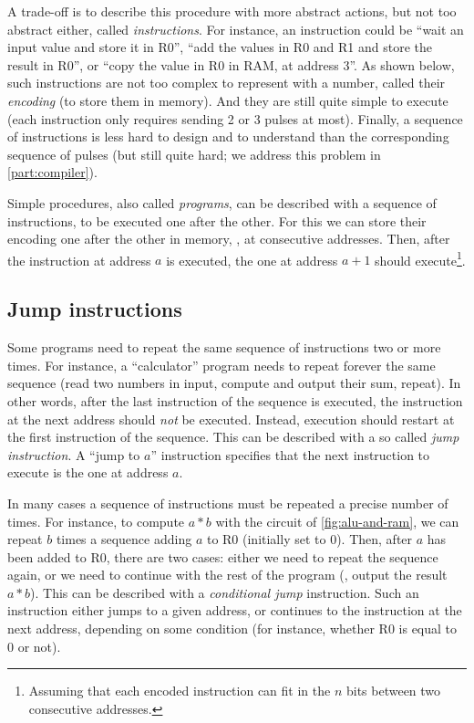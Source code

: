 A trade-off is to describe this procedure with more abstract actions, but not
too abstract either, called {\em instructions}. For instance, an instruction
could be ``wait an input value and store it in R0'', ``add the values in R0 and
R1 and store the result in R0'', or ``copy the value in R0 in RAM, at address
3''. As shown below, such instructions are not too complex to represent with a
number, called their {\em encoding} (to store them in memory). And they are
still quite simple to execute (each instruction only requires sending 2 or 3
pulses at most). Finally, a sequence of instructions is less hard to design and
to understand than the corresponding sequence of pulses (but still quite hard;
we address this problem in \cref{part:compiler}).

Simple procedures, also called {\em programs}, can be described with a sequence
of instructions, to be executed one after the other. For this we can store
their encoding one after the other in memory, \ie, at consecutive addresses.
Then, after the instruction at address $a$ is executed, the one at address
$a+1$ should execute\footnote{Assuming that each encoded instruction can fit in
the $n$ bits between two consecutive addresses.}.

\subsection{Jump instructions}

Some programs need to repeat the same sequence of instructions two or more
times. For instance, a ``calculator'' program needs to repeat forever the same
sequence (read two numbers in input, compute and output their sum, repeat). In
other words, after the last instruction of the sequence is executed, the
instruction at the next address should {\em not} be executed. Instead,
execution should restart at the first instruction of the sequence. This can be
described with a so called {\em jump instruction}. A ``jump to $a$''
instruction specifies that the next instruction to execute is the one at
address $a$.

In many cases a sequence of instructions must be repeated a precise number of
times. For instance, to compute $a*b$ with the circuit of
\cref{fig:alu-and-ram}, we can repeat $b$ times a sequence adding $a$ to R0
(initially set to 0). Then, after $a$ has been added to R0, there are two
cases: either we need to repeat the sequence again, or we need to continue with
the rest of the program (\eg, output the result $a*b$). This can be
described with a {\em conditional jump} instruction. Such an instruction either
jumps to a given address, or continues to the instruction at the next address,
depending on some condition (for instance, whether R0 is equal to 0 or not).

